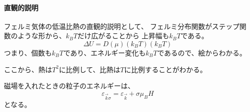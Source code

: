 \documentclass[titlepage]{ltjsarticle}
\begin{document}
\paragraph{直観的説明}
フェルミ気体の低温比熱の直観的説明として、
フェルミ分布関数がステップ関数のような形から、\(k_BT\)だけ広がることから
上昇幅も\(k_BT\)である。
\begin{equation}
  \varDelta  U = D(\mu)(k_BT)(k_BT)
\end{equation}
つまり、個数も\(k_BT\)であり、エネルギー変化も\(k_BT\)であるので、絵からわかる。

ここから、熱は\(T^2\)に比例して、比熱は\(T\)に比例することがわかる。









磁場を入れたときの粒子のエネルギーは、
\begin{equation}
  \varepsilon_{\vec{k}\sigma} = \varepsilon_{\vec{k}} + \sigma \mu_B H
\end{equation}
となる。
\end{document}
